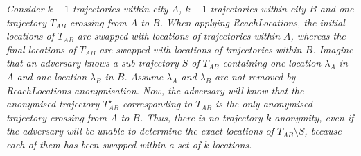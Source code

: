 \begin{example}{\em
Consider $k-1$ trajectories
within city $A$, $k-1$ trajectories within city $B$
and one trajectory $T_{AB}$ crossing from $A$ to $B$.
When applying ReachLocations, the initial locations of
$T_{AB}$ are swapped with locations of trajectories
within $A$, whereas the final locations of $T_{AB}$
are swapped with locations of trajectories within $B$.
Imagine that an adversary knows a sub-trajectory $S$
of $T_{AB}$ containing
one location $\lambda_A$ in $A$ and one
location $\lambda_B$ in $B$.
Assume $\lambda_A$ and $\lambda_B$ are not removed by
ReachLocations anonymisation.
Now, the adversary will know that the anonymised trajectory
$T^\star_{AB}$ corresponding to $T_{AB}$ is the only anonymised
trajectory crossing from $A$ to $B$. Thus, there is no
trajectory $k$-anonymity, even if the adversary will
be unable to determine the exact locations of $T_{AB} \setminus S$,
because each of them has been swapped within a set of $k$ locations.}
\end{example}

